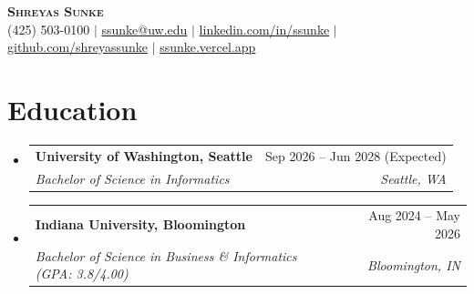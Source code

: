 \documentclass[letterpaper,11pt]{article}
\makeatletter
\newcommand{\resumeSubheading}[4]{\vspace{-2pt}\item\begin{tabular*}{0.97\textwidth}[t]{l@{\extracolsep{\fill}}r}\textbf{#1} & #2 \\\textit{\small#3} & \textit{\small #4} \\\end{tabular*}\vspace{-7pt}}
\newcommand{\resumeSubHeadingListStart}{\begin{itemize}[leftmargin=0.15in, label={}]}
\newcommand{\resumeSubHeadingListEnd}{\end{itemize}}
\makeatother
\begin{document}
\begin{center}
    \textbf{\Huge \scshape Shreyas Sunke} \\ \vspace{1pt}
    \small (425) 503-0100 $|$ \href{mailto:ssunke@uw.edu}{ssunke@uw.edu} $|$
    \href{https://linkedin.com/in/ssunke}{linkedin.com/in/ssunke} $|$
    \href{https://github.com/shreyassunke}{github.com/shreyassunke} $|$
    \href{https://ssunke.vercel.app/}{ssunke.vercel.app}
\end{center}

\section{Education}
  \resumeSubHeadingListStart
    \resumeSubheading
      {University of Washington, Seattle}{Sep 2026 -- Jun 2028 (Expected)}
      {Bachelor of Science in Informatics}{Seattle, WA}
    \resumeSubheading
      {Indiana University, Bloomington}{Aug 2024 -- May 2026}
      {Bachelor of Science in Business \& Informatics (GPA: 3.8/4.00)}{Bloomington, IN}
  \resumeSubHeadingListEnd
\end{document}
